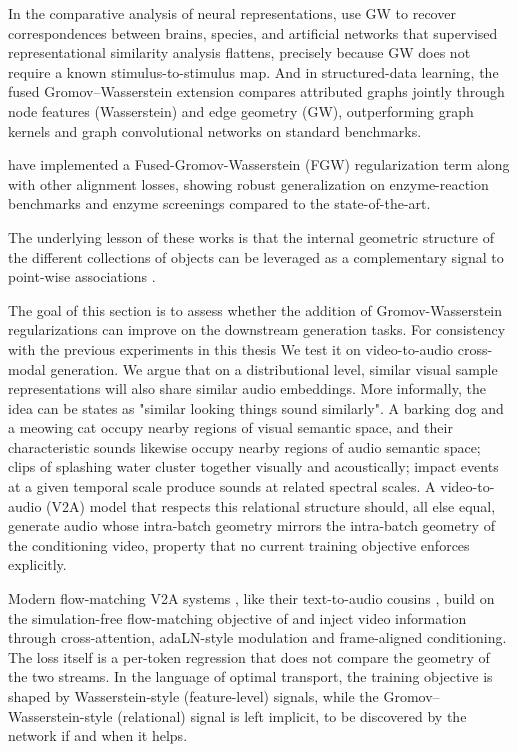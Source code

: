 In the comparative analysis of neural representations,
\citet{sasaki_2025_unsupervised} use GW to recover correspondences
between brains, species, and artificial networks that supervised
representational similarity analysis flattens, precisely because
GW does not require a known stimulus-to-stimulus map. And in
structured-data learning, the fused Gromov--Wasserstein extension
\citep{vayer_2019_optimal, vayer_2019_fused} compares attributed
graphs jointly through node features (Wasserstein) and edge
geometry (GW), outperforming graph kernels and graph convolutional
networks on standard benchmarks.

\cite{zhou2025fusedgromovwassersteincontrastivelearning} have implemented a Fused-Gromov-Wasserstein (FGW) regularization term along with other alignment losses, showing robust generalization on enzyme-reaction benchmarks and enzyme screenings compared to the state-of-the-art. 

The underlying lesson of these works is that the internal geometric structure of the different collections of objects can be leveraged as a complementary signal to point-wise associations \cite{chen_2020_graph, lu_2025_crossmodal, chandra_2025_realign, gong_2022_gromov, sasaki_2025_unsupervised, vayer_2019_optimal}.

The goal of this section is to assess whether the addition of Gromov-Wasserstein regularizations can improve on the downstream generation tasks. For consistency with the previous experiments in this thesis We test it on video-to-audio cross-modal generation. 
We argue that on a distributional level, similar visual sample representations will also share similar audio embeddings. More informally, the idea can be states as "similar looking things sound similarly". 
A barking dog and a meowing cat occupy nearby regions of visual semantic space, and their characteristic sounds likewise occupy nearby regions of audio semantic space; clips of
splashing water cluster together visually and acoustically; impact
events at a given temporal scale produce sounds at related
spectral scales. A video-to-audio (V2A) model that respects this
relational structure should, all else equal, generate audio whose
intra-batch geometry mirrors the intra-batch geometry of the
conditioning video, property that no current training objective enforces explicitly. 

Modern flow-matching V2A systems
\citep{wang_2024_frieren, cheng_2025_mmaudio}, like their
text-to-audio cousins \citep{guan_2024_lafma}, build on the
simulation-free flow-matching objective of
\citet{lipman_2023_flow, albergo_2023_building, liu_2023_rectified}
and inject video information through cross-attention, adaLN-style modulation and frame-aligned
conditioning. The loss itself is a per-token regression that does
not compare the geometry of the two streams. In the language of
optimal transport, the training objective is shaped by
Wasserstein-style (feature-level) signals, while the
Gromov--Wasserstein-style (relational) signal is left implicit, to
be discovered by the network if and when it helps.

